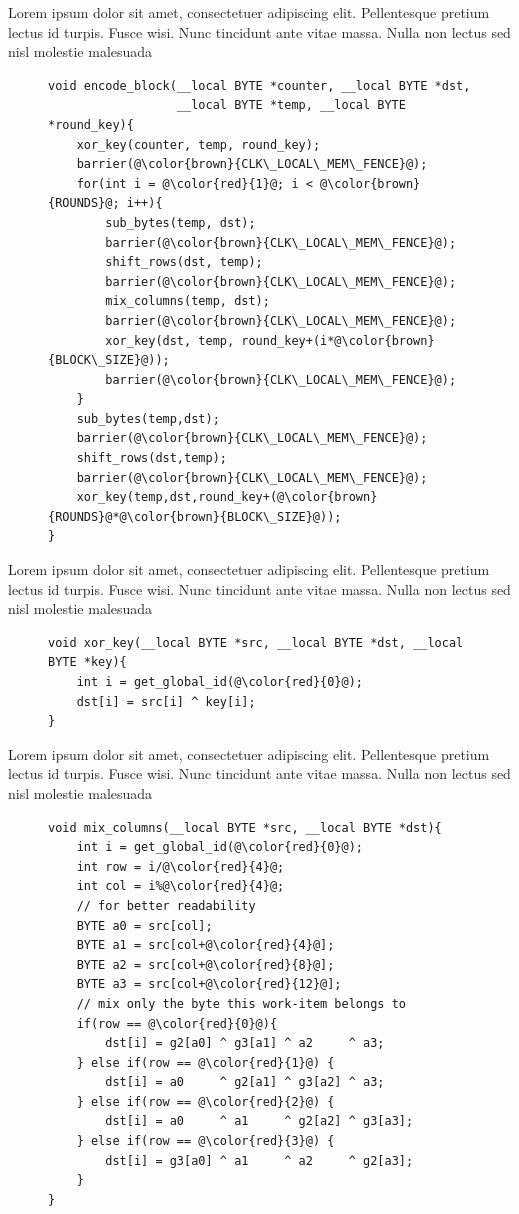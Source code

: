 Lorem ipsum dolor sit amet, consectetuer adipiscing elit. Pellentesque pretium lectus id turpis. Fusce wisi. Nunc tincidunt ante vitae massa. Nulla non lectus sed nisl molestie malesuada

\begin{figure}[H]
\begin{lstlisting}
void encode_block(__local BYTE *counter, __local BYTE *dst, 
                  __local BYTE *temp, __local BYTE *round_key){
    xor_key(counter, temp, round_key);
    barrier(@\color{brown}{CLK\_LOCAL\_MEM\_FENCE}@); 
    for(int i = @\color{red}{1}@; i < @\color{brown}{ROUNDS}@; i++){
        sub_bytes(temp, dst);
        barrier(@\color{brown}{CLK\_LOCAL\_MEM\_FENCE}@);
        shift_rows(dst, temp);
        barrier(@\color{brown}{CLK\_LOCAL\_MEM\_FENCE}@);
        mix_columns(temp, dst);
        barrier(@\color{brown}{CLK\_LOCAL\_MEM\_FENCE}@);
        xor_key(dst, temp, round_key+(i*@\color{brown}{BLOCK\_SIZE}@));
        barrier(@\color{brown}{CLK\_LOCAL\_MEM\_FENCE}@);
    }
    sub_bytes(temp,dst);
    barrier(@\color{brown}{CLK\_LOCAL\_MEM\_FENCE}@);
    shift_rows(dst,temp);
    barrier(@\color{brown}{CLK\_LOCAL\_MEM\_FENCE}@);
    xor_key(temp,dst,round_key+(@\color{brown}{ROUNDS}@*@\color{brown}{BLOCK\_SIZE}@));
}
\end{lstlisting}
\end{figure}

Lorem ipsum dolor sit amet, consectetuer adipiscing elit. Pellentesque pretium lectus id turpis. Fusce wisi. Nunc tincidunt ante vitae massa. Nulla non lectus sed nisl molestie malesuada

\begin{figure}[H]
\begin{lstlisting}
void xor_key(__local BYTE *src, __local BYTE *dst, __local BYTE *key){
    int i = get_global_id(@\color{red}{0}@);
    dst[i] = src[i] ^ key[i];
}
\end{lstlisting}
\end{figure}

Lorem ipsum dolor sit amet, consectetuer adipiscing elit. Pellentesque pretium lectus id turpis. Fusce wisi. Nunc tincidunt ante vitae massa. Nulla non lectus sed nisl molestie malesuada

\begin{figure}[H]
\begin{lstlisting}
void mix_columns(__local BYTE *src, __local BYTE *dst){
    int i = get_global_id(@\color{red}{0}@);
    int row = i/@\color{red}{4}@;
    int col = i%@\color{red}{4}@;
    // for better readability
    BYTE a0 = src[col]; 
    BYTE a1 = src[col+@\color{red}{4}@];
    BYTE a2 = src[col+@\color{red}{8}@];
    BYTE a3 = src[col+@\color{red}{12}@];
    // mix only the byte this work-item belongs to
    if(row == @\color{red}{0}@){
        dst[i] = g2[a0] ^ g3[a1] ^ a2     ^ a3;
    } else if(row == @\color{red}{1}@) {
        dst[i] = a0     ^ g2[a1] ^ g3[a2] ^ a3;
    } else if(row == @\color{red}{2}@) {
        dst[i] = a0     ^ a1     ^ g2[a2] ^ g3[a3];
    } else if(row == @\color{red}{3}@) {
        dst[i] = g3[a0] ^ a1     ^ a2     ^ g2[a3];
    }
}
\end{lstlisting}
\end{figure}

